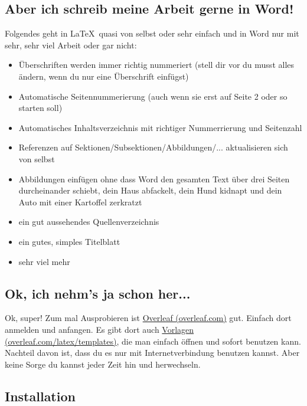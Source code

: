 \documentclass[titlepage]{article}
\begin{document}
\subsection{Aber ich schreib meine Arbeit gerne in Word!}

Folgendes geht in \LaTeX\ quasi von selbst oder sehr einfach und in Word nur mit sehr, sehr viel Arbeit oder gar nicht:
\begin{itemize}
    \item Überschriften werden immer richtig nummeriert (stell dir vor du musst alles ändern, wenn du nur eine Überschrift einfügst)
    \item Automatische Seitennummerierung (auch wenn sie erst auf Seite 2 oder so starten soll)
    \item Automatisches Inhaltsverzeichnis mit richtiger Nummerrierung und Seitenzahl
    \item Referenzen auf Sektionen/Subsektionen/Abbildungen/... aktualisieren sich von selbst
    \item Abbildungen einfügen ohne dass Word den gesamten Text über drei Seiten durcheinander schiebt, dein Haus abfackelt, dein Hund kidnapt und dein Auto mit einer Kartoffel zerkratzt
    \item ein gut aussehendes Quellenverzeichnis
    \item ein gutes, simples Titelblatt
    \item sehr viel mehr
\end{itemize}

\subsection{Ok, ich nehm's ja schon her...} \label{hernehmen}

Ok, super! 
Zum mal Ausprobieren ist \href{https://www.overleaf.com/}{Overleaf (overleaf.com)} gut.
Einfach dort anmelden und anfangen.
Es gibt dort auch \href{https://www.overleaf.com/latex/templates}{Vorlagen (overleaf.com/latex/templates)}, die man einfach öffnen und sofort benutzen kann. \\

Nachteil davon ist, dass du es nur mit Internetverbindung benutzen kannst.
Aber keine Sorge du kannst jeder Zeit hin und herwechseln.

\subsection{Installation} \label{Installation}
\end{document}
